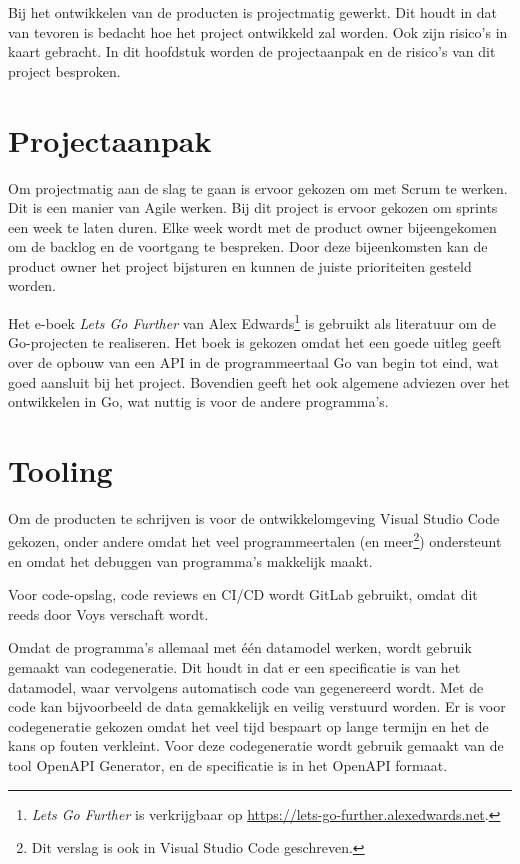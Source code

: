 \documentclass[../report.tex]{subfiles}
\begin{document}
Bij het ontwikkelen van de producten is projectmatig gewerkt. Dit houdt in dat van tevoren is bedacht hoe het project ontwikkeld zal worden. Ook zijn risico's in kaart gebracht. In dit hoofdstuk worden de projectaanpak en de risico's van dit project besproken.

\section{Projectaanpak}

Om projectmatig aan de slag te gaan is ervoor gekozen om met \gls*{Scrum} te werken. Dit is een manier van \gls*{Agile} werken. Bij dit project is ervoor gekozen om \glspl*{sprint} een week te laten duren. Elke week wordt met de \gls*{product owner} bijeengekomen om de backlog en de voortgang te bespreken. Door deze bijeenkomsten kan de \gls*{product owner} het project bijsturen en kunnen de juiste prioriteiten gesteld worden.

Het e-boek \textit{Lets Go Further} van Alex Edwards\footnote{\textit{Lets Go Further} is verkrijgbaar op \url{https://lets-go-further.alexedwards.net}.} is gebruikt als literatuur om de \gls*{Go}-projecten te realiseren. Het boek is gekozen omdat het een goede uitleg geeft over de opbouw van een \gls*{API} in de programmeertaal \gls*{Go} van begin tot eind, wat goed aansluit bij het project. Bovendien geeft het ook algemene adviezen over het ontwikkelen in \gls*{Go}, wat nuttig is voor de andere programma's.

\section{Tooling}

Om de producten te schrijven is voor de ontwikkelomgeving Visual Studio Code gekozen, onder andere omdat het veel programmeertalen (en meer\footnote{Dit verslag is ook in Visual Studio Code geschreven.}) ondersteunt en omdat het debuggen van programma's makkelijk maakt.

Voor code-opslag, code reviews en \gls*{CI/CD} wordt GitLab gebruikt, omdat dit reeds door Voys verschaft wordt.

Omdat de programma's allemaal met één datamodel werken, wordt gebruik gemaakt van codegeneratie. Dit houdt in dat er een specificatie is van het datamodel, waar vervolgens automatisch code van gegenereerd wordt. Met de code kan bijvoorbeeld de data gemakkelijk en veilig verstuurd worden. Er is voor codegeneratie gekozen omdat het veel tijd bespaart op lange termijn en het de kans op fouten verkleint. Voor deze codegeneratie wordt gebruik gemaakt van de tool \gls*{OpenAPI} Generator, en de specificatie is in het \gls*{OpenAPI} formaat.
\end{document}
